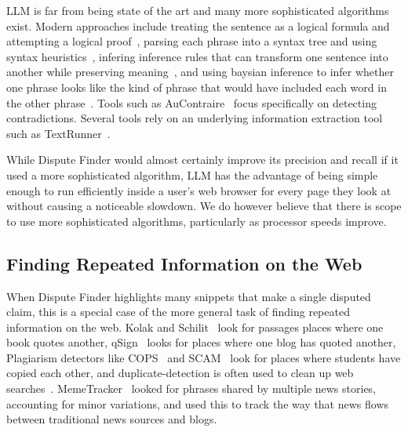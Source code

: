 \documentclass{www2010-submission}
\newcommand{\todo}[1]{}
\begin{document}
\todo{Implement word weighting and word similarity?}

%

LLM is far from being state of the art and many more sophisticated algorithms exist. Modern approaches include treating the sentence as a logical formula and attempting a logical proof~\cite{Bayer2001,Bos2005}, parsing each phrase into a syntax tree and using syntax heuristics~\cite{Snow2006}, infering inference rules that can transform one sentence into another while preserving meaning~\cite{Lin2002,Dinu2009,Bhagat2009}, and using baysian inference to infer whether one phrase looks like the kind of phrase that would have included each word in the other phrase~\cite{Glickman2005}. Tools such as AuContraire~\cite{Ritter2008} focus specifically on detecting contradictions. Several tools rely on an underlying information extraction tool such as TextRunner~\cite{Etzioni2008}.

While Dispute Finder would almost certainly improve its precision and recall if it used a more sophisticated algorithm, LLM has the advantage of being simple enough to run efficiently inside a user's web browser for every page they look at without causing a noticeable slowdown. We do however believe that there is scope to use more sophisticated algorithms, particularly as processor speeds improve.

\todo{Talk about Glickman et all 2005 and MT system of Bayer et al 2005}
\todo{Cite Web Based probabalistic textual entailment}
\todo{Cite MITRE's submission to the EU PASCAL RTE Challenge}

\todo{Talk a lot about how people do textual entailment now}
\todo{Do human-guided approach that works well? Talk more about human guided task.}



\subsection{Finding Repeated Information on the Web}

\todo{is this important}

When Dispute Finder highlights many snippets that make a single disputed claim, this is a special case of the more general task of finding repeated information on the web. Kolak and Schilit~\cite{Kolak2008} look for passages places where one book quotes another, qSign~\cite{Kim2009} looks for places where one blog has quoted another, Plagiarism detectors like COPS~\cite{COPS} and SCAM~\cite{SCAM} look for places where students have copied each other, and duplicate-detection is often used to clean up web searches~\cite{web-copy-detect}. MemeTracker~\cite{Backstrom2009} looked for phrases shared by multiple news stories, accounting for minor variations, and used this to track the way that news flows between traditional news sources and blogs.
\end{document}
